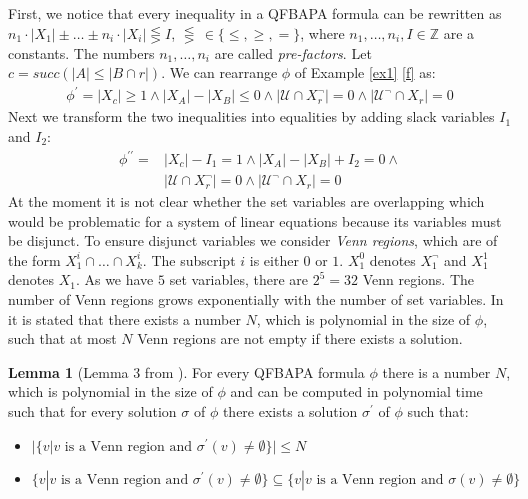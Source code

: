 \documentclass{book}
\theoremstyle{break}
\theoremstyle{definition}
\newtheorem{mylem}{Lemma}
\begin{document}
First, we notice that every inequality in a QFBAPA formula can be
rewritten as $n_1\cdot|X_1|\pm \dots \pm n_i\cdot|X_i|\lesseqgtr I$, $\lesseqgtr\,\in\{\leq,\geq,=\}$, where $n_1,\dots, n_i,I\in\mathbb{Z}$ are a constants. The numbers $n_1,\dots,n_i$ are called \textit{pre-factors}. Let $c={succ(|A|\leq |B\cap r|)}$. We can rearrange $\phi$   of Example \ref{ex1} \eqref{f} as:
\begin{align}
\phi^\prime=|X_{c}|\geq 1\wedge |X_A|- |X_B|\leq 0 \wedge |\mathcal{U}\cap X_r^\neg|=0\wedge |\mathcal{U}^\neg\cap X_r|=0
\end{align} 
Next we transform the two inequalities into equalities by adding slack variables $I_1$ and $I_2$:
\begin{align}
\phi^{\prime\prime}=&|X_{c}|- I_1= 1\wedge |X_A|-|X_B|+I_2= 0 \wedge \nonumber\\
&|\mathcal{U}\cap X_r^\neg|=0\wedge |\mathcal{U}^\neg\cap X_r|=0
\end{align}
At the moment it is not clear whether the set variables are overlapping which would be problematic for a system of linear equations because its variables must be disjunct. To ensure disjunct variables we consider \textit{Venn regions}, which are of the form $X^i_1\cap \dots \cap X^i_k$. The subscript $i$ is either $0$ or $1$. $X^0_1$ denotes $X^\neg_1$ and $X^1_1$ denotes $X_1$. As we have $5$ set variables, there are $2^5=32$ Venn regions. The number of Venn regions grows exponentially with the number of set variables. In \cite{4} it is stated that there exists a number $N$, which is polynomial in the size of $\phi$, such that at most $N$ Venn regions are not empty if there exists a solution.
\begin{mylem}[Lemma 3 from \cite{4}]
For every QFBAPA formula $\phi$ there is a number $N$, which is polynomial in the size of $\phi$ and can be computed in polynomial time such that for every solution $\sigma$ of $\phi$ there exists a solution $\sigma^\prime$ of $\phi$ such that:
\begin{itemize}
\item $|\{v|v\text{ is a Venn region and }\sigma^\prime(v)\neq \emptyset\}|\leq N$
\item $\{v|v\text{ is a Venn region and }\sigma^\prime(v)\neq \emptyset\}\subseteq \{v|v\text{ is a Venn region and }\sigma(v)\neq \emptyset\}$
\end{itemize}
\end{mylem}
\end{document}
